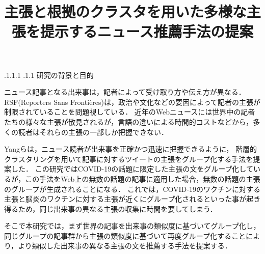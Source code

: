 \documentclass[a4paper, twocolumn, 10pt]{jarticle}
\makeatletter
\def\section{%
	\@startsection{section}{1}{\z@}%
	{.1\Cvs \@plus.1\Cdp \@minus.1\Cdp}%
	{.1\Cvs \@plus.1\Cdp}%
	{\normalfont\normalsize\bfseries}%
}
\makeatother
\begin{document}
\title{主張と根拠のクラスタを用いた多様な主張を提示するニュース推薦手法の提案}

\maketitle

\thispagestyle{empty}

\section{研究の背景と目的}

ニュース記事となる出来事は，記者によって受け取り方や伝え方が異なる．
RSF(Reporters Sans Frontières)は，政治や文化などの要因によって記者の主張が制限されていることを問題視している\cite{2021_world_press_freedom_index}．
近年のWebニュースには世界中の記者たちの様々な主張が散見されるが，言語の違いによる時間的コストなどから，多くの読者はそれらの主張の一部しか把握できない．

Yangらは，ニュース読者が出来事を正確かつ迅速に把握できるように，
階層的クラスタリングを用いて記事に対するツイートの主張をグループ化する手法を提案した\cite{yang_scalable_2021}．
この研究ではCOVID-19の話題に限定した主張の文をグループ化しているが，この手法をWeb上の無数の話題の記事に適用した場合，無数の話題の主張のグループが生成されることになる．
これでは，COVID-19のワクチンに対する主張と脳炎のワクチンに対する主張が近くにグループ化されるといった事が起き得るため，同じ出来事の異なる主張の収集に時間を要してしまう．





そこで本研究では，まず世界の記事を出来事の類似度に基づいてグループ化し，同じグループの記事群から主張の類似度に基づいて再度グループ化することにより，より類似した出来事の異なる主張の文を推薦する手法を提案する．
\end{document}
